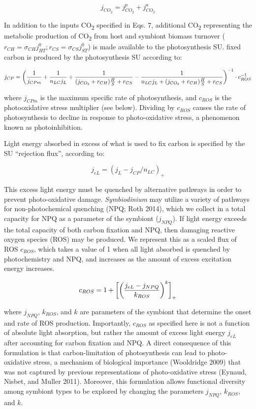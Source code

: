 \documentclass[]{elsarticle} %
\begin{document}
\begin{equation} j_{CO_2} = j_{CO_2}^p + j_{CO_2}^a \end{equation}

In addition to the inputs CO\textsubscript{2} specified in Eqs. 7,
additional CO\textsubscript{2} representing the metabolic production of
CO\textsubscript{2} from host and symbiont biomass turnover
(\(r_{CH}=\sigma_{CH}j_{HT}^0; r_{CS}=\sigma_{CS}j_{ST}^0\)) is made
available to the photosynthesis SU. fixed carbon is produced by the
photosynthesis SU according to:

\begin{equation} j_{CP} = \bigg({1 \over j_{CPm}} + {1 \over {n_{LC} j_L }} + {1 \over {(j_{CO_2} + r_{CH}){H \over S} + r_{CS}}} - {1 \over {n_{LC} j_L + (j_{CO_2} + r_{CH}){H \over S} + r_{CS}}}\bigg)^{-1} \cdot c_{ROS}^{-1} \end{equation}

where \(j_{CPm}\) is the maximum specific rate of photosynthesis, and
\(c_{ROS}\) is the photooxidative stress multiplier (see below).
Dividing by \(c_{ROS}\) causes the rate of photosynthesis to decline in
response to photo-oxidative stress, a phenomenon known as
photoinhibition.

Light energy absorbed in excess of what is used to fix carbon is
specified by the SU ``rejection flux'', according to:

\begin{equation} j_{eL} = (j_L - j_{CP} / n_{LC})_+ \end{equation}

This excess light energy must be quenched by alternative pathways in
order to prevent photo-oxidative damage. \emph{Symbiodinium} may utilize
a variety of pathways for non-photochemical quenching (NPQ; Roth 2014),
which we collect in a total capacity for NPQ as a parameter of the
symbiont (\(j_{NPQ}\)). If light energy exceeds the total capacity of
both carbon fixation and NPQ, then damaging reactive oxygen species
(ROS) may be produced. We represent this as a scaled flux of ROS
\(c_{ROS}\), which takes a value of 1 when all light absorbed is
quenched by photochemistry and NPQ, and increases as the amount of
excess excitation energy increases.

\begin{equation} c_{ROS} = 1 + \bigg[\bigg({{j_{eL} - j_{NPQ}} \over k_{ROS}}\bigg)^k\bigg]_+ \end{equation}

where \(j_{NPQ}\), \(k_{ROS}\), and \(k\) are parameters of the symbiont
that determine the onset and rate of ROS production. Importantly,
\(c_{ROS}\) as specified here is not a function of absolute light
absorption, but rather the amount of excess light energy \(j_{eL}\)
after accounting for carbon fixation and NPQ. A direct consequence of
this formulation is that carbon-limitation of photosynthesis can lead to
photo-oxidative stress, a mechanism of biological importance (Wooldridge
2009) that was not captured by previous representations of
photo-oxidative stress (Eynaud, Nisbet, and Muller 2011). Moreover, this
formulation allows functional diversity among symbiont types to be
explored by changing the parameters \(j_{NPQ}\), \(k_{ROS}\), and \(k\).
\end{document}
